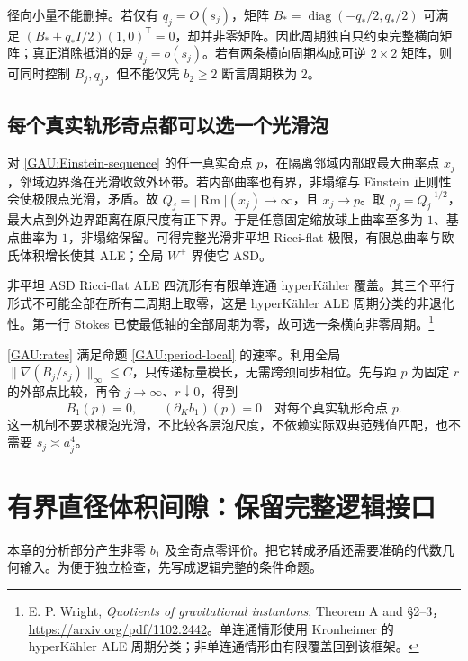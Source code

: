 \documentclass[UTF8,fontset=fandol,zihao=-4,oneside,openany]{ctexbook}
\theoremstyle{cjkplain}
\numberwithin{equation}{chapter}
\begin{document}
径向小量不能删掉。若仅有 $q_j=O(s_j)$，矩阵
$B_*=\operatorname{diag}(-q_*/2,q_*/2)$ 可满足
$(B_*+q_*I/2)(1,0)^{\mathsf T}=0$，却并非零矩阵。因此周期独自只约束完整横向矩阵；真正消除抵消的是 $q_j=o(s_j)$。若有两条横向周期构成可逆 $2\times2$ 矩阵，则可同时控制 $B_j,q_j$，但不能仅凭 $b_2\ge2$ 断言周期秩为 $2$。

\subsection{每个真实轨形奇点都可以选一个光滑泡}
对 \eqref{GAU:Einstein-sequence} 的任一真实奇点 $p$，在隔离邻域内部取最大曲率点 $x_j$，邻域边界落在光滑收敛外环带。若内部曲率也有界，非塌缩与 Einstein 正则性会使极限点光滑，矛盾。故 $Q_j=|\operatorname{Rm}|(x_j)\to\infty$，且 $x_j\to p$。取 $\rho_j=Q_j^{-1/2}$，最大点到外边界距离在原尺度有正下界。于是任意固定缩放球上曲率至多为 $1$、基点曲率为 $1$，非塌缩保留。可得完整光滑非平坦 Ricci-flat 极限，有限总曲率与欧氏体积增长使其 ALE；全局 $W^+$ 界使它 ASD。

非平坦 ASD Ricci-flat ALE 四流形有有限单连通 hyperKähler 覆盖。其三个平行形式不可能全部在所有二周期上取零，这是 hyperKähler ALE 周期分类的非退化性。第一行 Stokes 已使最低轴的全部周期为零，故可选一条横向非零周期。\footnote{E. P. Wright, \emph{Quotients of gravitational instantons}, Theorem A and §2--3，\url{https://arxiv.org/pdf/1102.2442}。单连通情形使用 Kronheimer 的 hyperKähler ALE 周期分类；非单连通情形由有限覆盖回到该框架。}

\eqref{GAU:rates} 满足命题 \ref{GAU:period-local} 的速率。利用全局
$\|\nabla(B_j/s_j)\|_\infty\le C$，只传递标量模长，无需跨颈同步相位。先与距 $p$ 为固定 $r$ 的外部点比较，再令 $j\to\infty$、$r\downarrow0$，得到
\begin{equation}\label{GAU:all-point-zero}
B_1(p)=0,\qquad(\partial_Kb_1)(p)=0
\quad\text{对每个真实轨形奇点 }p.
\end{equation}
这一机制不要求根泡光滑，不比较各层泡尺度，不依赖实际双典范残值匹配，也不需要 $s_j\asymp a_j^4$。

\section{有界直径体积间隙：保留完整逻辑接口}
\label{GAU:gap}

本章的分析部分产生非零 $b_1$ 及全奇点零评价。把它转成矛盾还需要准确的代数几何输入。为便于独立检查，先写成逻辑完整的条件命题。
\end{document}
